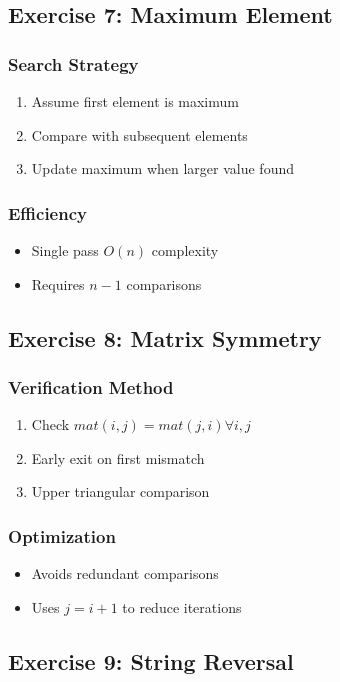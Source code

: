 \documentclass{book}
\begin{document}
\subsection*{Exercise 7: Maximum Element}
\subsubsection*{Search Strategy}
\begin{enumerate}
\item Assume first element is maximum
\item Compare with subsequent elements
\item Update maximum when larger value found
\end{enumerate}

\subsubsection*{Efficiency}
\begin{itemize}
\item Single pass \( O(n) \) complexity
\item Requires \( n-1 \) comparisons
\end{itemize}

\subsection*{Exercise 8: Matrix Symmetry}
\subsubsection*{Verification Method}
\begin{enumerate}
\item Check \( mat(i,j) = mat(j,i) \forall i,j \)
\item Early exit on first mismatch
\item Upper triangular comparison
\end{enumerate}

\subsubsection*{Optimization}
\begin{itemize}
\item Avoids redundant comparisons
\item Uses \( j = i+1 \) to reduce iterations
\end{itemize}

\subsection*{Exercise 9: String Reversal}
\end{document}
